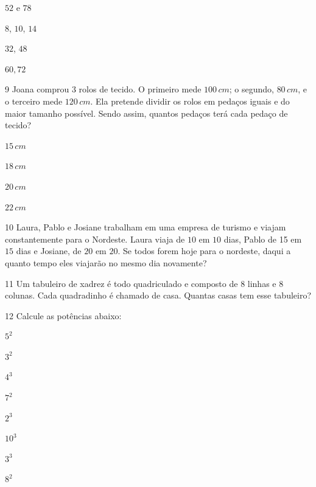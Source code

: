 {\begin{escolha}
\item $52$ e $78$ 
\item $8$, $10$, $14$ 
\item $32$, $48$ 
\item $60,72$ 
\end{escolha}

\num{9} Joana comprou $3$ rolos de tecido. O primeiro mede $100\,cm$; o segundo,
$80\,cm$, e o terceiro mede $120\,cm$. Ela pretende dividir os rolos em
pedaços iguais e do maior tamanho possível. Sendo assim, quantos pedaços
terá cada pedaço de tecido?

\begin{escolha}
\item $15\,cm$ \reduline{\hfill}
\item $18\,cm$ \reduline{\hfill}
\item $20\,cm$ \reduline{\hfill}
\item $22\,cm$ 
\end{escolha}

\num{10} Laura, Pablo e Josiane trabalham em uma empresa de turismo e viajam
constantemente para o Nordeste. Laura viaja de $10$ em $10$ dias, Pablo de
15 em $15$ dias e Josiane, de $20$ em $20$. Se todos forem hoje para o
nordeste, daqui a quanto tempo eles viajarão no mesmo dia novamente?


\num{11} Um tabuleiro de xadrez é todo quadriculado e composto de $8$ linhas e
$8$ colunas. Cada quadradinho é chamado de casa. Quantas casas tem esse
tabuleiro?



\num{12} Calcule as potências abaixo:

\begin{escolha}
\item $5^2$ 
\item $3^2$ 
\item $4^3$ 
\item $7^2$ 
\item $2^3$ 
\item $10^3$ 
\item $3^3$ 
\item $8^2$ 
\end{escolha}

}
